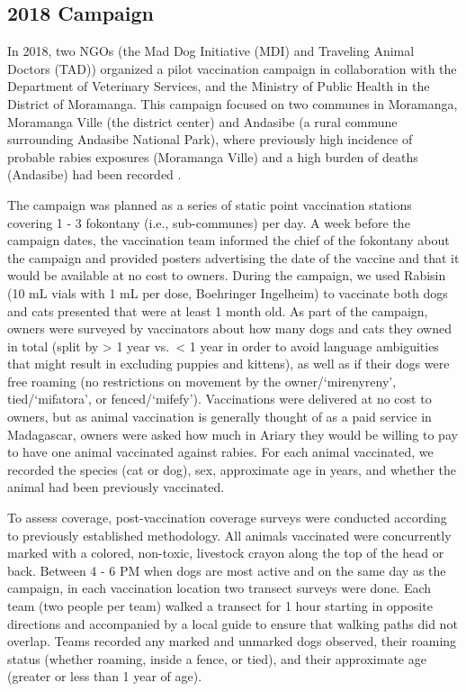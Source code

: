 \documentclass[tropicalmed,article,submit,moreauthors,pdftex]{mdpi}
\begin{document}
\hypertarget{campaign}{%
\subsection{2018 Campaign}\label{campaign}}

In 2018, two NGOs (the Mad Dog Initiative (MDI) and Traveling Animal
Doctors (TAD)) organized a pilot vaccination campaign in collaboration
with the Department of Veterinary Services, and the Ministry of Public
Health in the District of Moramanga. This campaign focused on two
communes in Moramanga, Moramanga Ville (the district center) and
Andasibe (a rural commune surrounding Andasibe National Park), where
previously high incidence of probable rabies exposures (Moramanga Ville)
and a high burden of deaths (Andasibe) had been recorded
\citep{rajeev2018}.

The campaign was planned as a series of static point vaccination
stations covering 1 - 3 fokontany (i.e., sub-communes) per day. A week
before the campaign dates, the vaccination team informed the chief of
the fokontany about the campaign and provided posters advertising the
date of the vaccine and that it would be available at no cost to owners.
During the campaign, we used Rabisin (10 mL vials with 1 mL per dose,
Boehringer Ingelheim) to vaccinate both dogs and cats presented that
were at least 1 month old. As part of the campaign, owners were surveyed
by vaccinators about how many dogs and cats they owned in total (split
by \textgreater{} 1 year vs.~\textless{} 1 year in order to avoid
language ambiguities that might result in excluding puppies and
kittens), as well as if their dogs were free roaming (no restrictions on
movement by the owner/`mirenyreny', tied/`mifatora', or
fenced/`mifefy'). Vaccinations were delivered at no cost to owners, but
as animal vaccination is generally thought of as a paid service in
Madagascar, owners were asked how much in Ariary they would be willing
to pay to have one animal vaccinated against rabies. For each animal
vaccinated, we recorded the species (cat or dog), sex, approximate age
in years, and whether the animal had been previously vaccinated.

To assess coverage, post-vaccination coverage surveys were conducted
according to previously established
methodology\citep{sambo2017, gibson2015}. All animals vaccinated were
concurrently marked with a colored, non-toxic, livestock crayon along
the top of the head or back. Between 4 - 6 PM when dogs are most active
\citep{sambo2017} and on the same day as the campaign, in each
vaccination location two transect surveys were done. Each team (two
people per team) walked a transect for 1 hour starting in opposite
directions and accompanied by a local guide to ensure that walking paths
did not overlap. Teams recorded any marked and unmarked dogs observed,
their roaming status (whether roaming, inside a fence, or tied), and
their approximate age (greater or less than 1 year of age).
\end{document}
